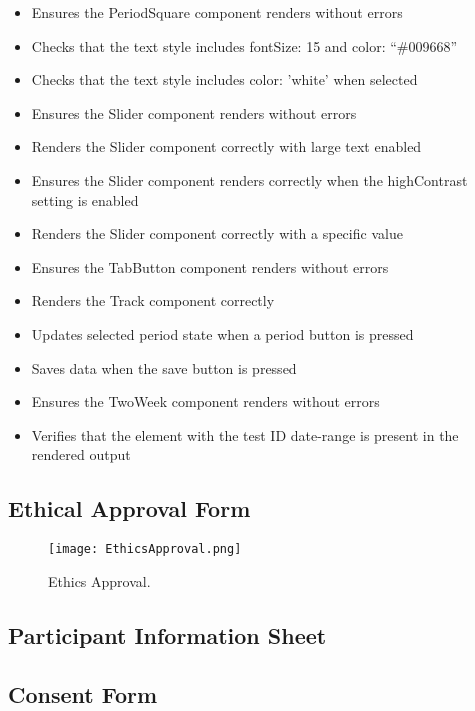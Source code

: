 \begin{itemize}
  \item Ensures the PeriodSquare component renders without errors
  \item Checks that the text style includes fontSize: 15 and color: ``\#009668''
  \item Checks that the text style includes color: 'white' when selected
  \item Ensures the Slider component renders without errors
  \item Renders the Slider component correctly with large text enabled
  \item Ensures the Slider component renders correctly when the highContrast setting is enabled
  \item Renders the Slider component correctly with a specific value
  \item Ensures the TabButton component renders without errors
  \item Renders the Track component correctly
  \item Updates selected period state when a period button is pressed
  \item Saves data when the save button is pressed
  \item Ensures the TwoWeek component renders without errors
  \item Verifies that the element with the test ID date-range is present in the rendered output
\end{itemize}

\subsection{Ethical Approval Form}

\begin{figure}[h!!]
    \begin{center}
      \texttt{[image: EthicsApproval.png]}
      \caption{Ethics Approval.}
      \label{figure:ethics-approval}
    \end{center}
  \end{figure}
  
\subsection{Participant Information Sheet }


\subsection{Consent Form }


